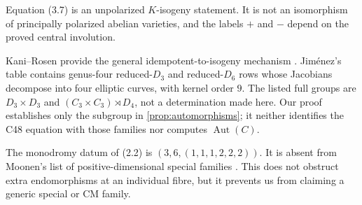 \begin{remark}\label{rem:isogeny-boundary}
Equation (3.7) is an unpolarized \(K\)-isogeny statement.  It is not an
isomorphism of principally polarized abelian varieties, and the labels
\(+\) and \(-\) depend on the proved central involution.

Kani--Rosen provide the general idempotent-to-isogeny mechanism
\cite[Theorem~A]{KaniRosen1989}.  Jim\'enez's
\cite[\S5.1 and Theorem~3]{Jimenez2016} table contains genus-four
reduced-\(D_3\) and reduced-\(D_6\) rows whose Jacobians decompose into four
elliptic curves, with kernel order \(9\).  The listed full groups are
\(D_3\times D_3\) and \((C_3\times C_3)\rtimes D_4\), not a determination
made here.  Our proof establishes only the subgroup in
\cref{prop:automorphisms}; it neither identifies the C48 equation with
those families nor computes \(\operatorname{Aut}(C)\).

The monodromy datum of (2.2) is
\((3,6,(1,1,1,2,2,2))\).  It is absent from Moonen's list of
positive-dimensional special families
\cite[\S3.4, Table~1 and Theorem~3.6]{Moonen2010}.  This does not obstruct
extra endomorphisms at an individual fibre, but it prevents us from
claiming a generic special or CM family.
\end{remark}
